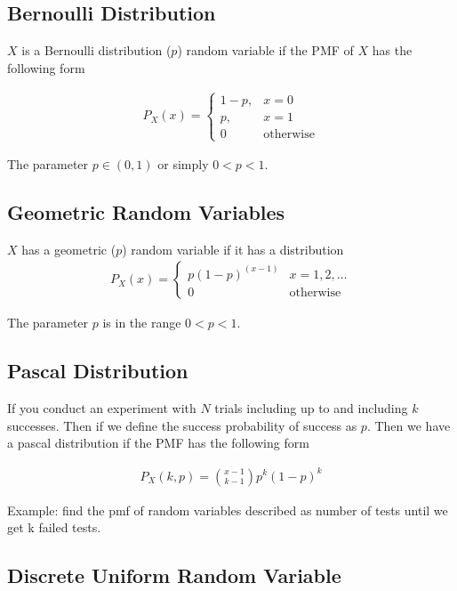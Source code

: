 \documentclass[12pt, titlepage, oneside]{article}
\begin{document}
\subsection{Bernoulli Distribution}

$X$ is a Bernoulli distribution ($p$) random variable if the PMF of $X$ has the following form

\begin{align}
P_X(x) = \begin{cases} 1-p, & x = 0 \\ p, & x = 1\\ 0 & \mbox{otherwise}  \end{cases}
\end{align}

The parameter $p \in (0,1)$ or simply $ 0 < p < 1$.

\subsection{Geometric Random Variables}

$X$ has a geometric ($p$) random variable if it has a distribution 
\begin{align}
P_X(x) = \begin{cases} p(1-p)^{(x-1)} & x = 1,2,\dots \\ 0 & \mbox{otherwise}\end{cases}
\end{align}

The parameter $p$ is in the range $0 < p < 1$.

\subsection{Pascal Distribution}
If you conduct an experiment with $N$ trials including up to and including $k$ successes. Then if we define the success probability of success as $p$. Then we have a pascal distribution if the PMF has the following form

\begin{align}
P_X(k,p) = {x-1 \choose k-1}p^k (1-p)^k
\end{align}

Example: find the pmf of random variables described as number of tests until we get k failed tests. 


\subsection{Discrete Uniform Random Variable}
\end{document}
